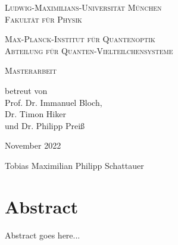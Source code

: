 \begin{titlepage}
    \vspace*{\fill}
    \centering

    \textsc{\Large Ludwig-Maximilians-Universität München}\\
    \textsc{Fakultät für Physik}

    \vspace{1cm}

    \textsc{\Large Max-Planck-Institut für Quantenoptik}\\
    \textsc{Abteilung für Quanten-Vielteilchensysteme}

    \vspace{2.3cm}

    \begin{doublespace}
        \textsc{ \Huge \titleDE}
    \end{doublespace}


    \vspace{2.3cm}
    \huge \textsc{Masterarbeit}



    \vspace{0.3cm}
    \large \textrm{betreut von\\Prof. Dr. Immanuel Bloch,\\Dr. Timon Hiker\\und Dr. Philipp Preiß}

    \vspace{1.5cm}
    \huge
    \textrm{November 2022}

    \vspace{1.5cm}
    \Large \textrm{Tobias Maximilian Philipp Schattauer}

    \vspace*{\fill}
\end{titlepage}

\begin{titlepage}
    \null
\end{titlepage}

\restoregeometry

\null\vspace{3cm}
\section*{Abstract}

Abstract goes here...



\pagebreak
\tableofcontents
\pagebreak